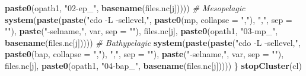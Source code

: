 \documentclass[]{book}
\newenvironment{Shaded}{\begin{snugshade}}{\end{snugshade}}
\newcommand{\CommentTok}[1]{\textcolor[rgb]{0.56,0.35,0.01}{\textit{#1}}}
\newcommand{\DataTypeTok}[1]{\textcolor[rgb]{0.13,0.29,0.53}{#1}}
\newcommand{\KeywordTok}[1]{\textcolor[rgb]{0.13,0.29,0.53}{\textbf{#1}}}
\newcommand{\NormalTok}[1]{#1}
\newcommand{\StringTok}[1]{\textcolor[rgb]{0.31,0.60,0.02}{#1}}
\begin{document}
\begin{Shaded}
\begin{Highlighting}[]
{{                       \KeywordTok{paste0}\NormalTok{(opath1, }\StringTok{"02-ep_"}\NormalTok{, }\KeywordTok{basename}\NormalTok{(files.nc[j]))))}
        \CommentTok{# Mesopelagic}
          \KeywordTok{system}\NormalTok{(}\KeywordTok{paste}\NormalTok{(}\KeywordTok{paste}\NormalTok{(}\StringTok{"cdo -L -sellevel,"}\NormalTok{, }
                             \KeywordTok{paste0}\NormalTok{(mp, }\DataTypeTok{collapse =} \StringTok{","}\NormalTok{), }\StringTok{","}\NormalTok{, }\DataTypeTok{sep =} \StringTok{""}\NormalTok{), }
                       \KeywordTok{paste}\NormalTok{(}\StringTok{"-selname,"}\NormalTok{, var, }\DataTypeTok{sep =} \StringTok{""}\NormalTok{), files.nc[j], }
                       \KeywordTok{paste0}\NormalTok{(opath1, }\StringTok{"03-mp_"}\NormalTok{, }\KeywordTok{basename}\NormalTok{(files.nc[j]))))}
        \CommentTok{# Bathypelagic}
          \KeywordTok{system}\NormalTok{(}\KeywordTok{paste}\NormalTok{(}\KeywordTok{paste}\NormalTok{(}\StringTok{"cdo -L -sellevel,"}\NormalTok{, }
                             \KeywordTok{paste0}\NormalTok{(bap, }\DataTypeTok{collapse =} \StringTok{","}\NormalTok{), }\StringTok{","}\NormalTok{, }\DataTypeTok{sep =} \StringTok{""}\NormalTok{), }
                       \KeywordTok{paste}\NormalTok{(}\StringTok{"-selname,"}\NormalTok{, var, }\DataTypeTok{sep =} \StringTok{""}\NormalTok{), files.nc[j], }
                       \KeywordTok{paste0}\NormalTok{(opath1, }\StringTok{"04-bap_"}\NormalTok{, }\KeywordTok{basename}\NormalTok{(files.nc[j]))))}
\NormalTok{    \}}
    \KeywordTok{stopCluster}\NormalTok{(cl)}
    
}}
\end{Highlighting}
\end{Shaded}
\end{document}
